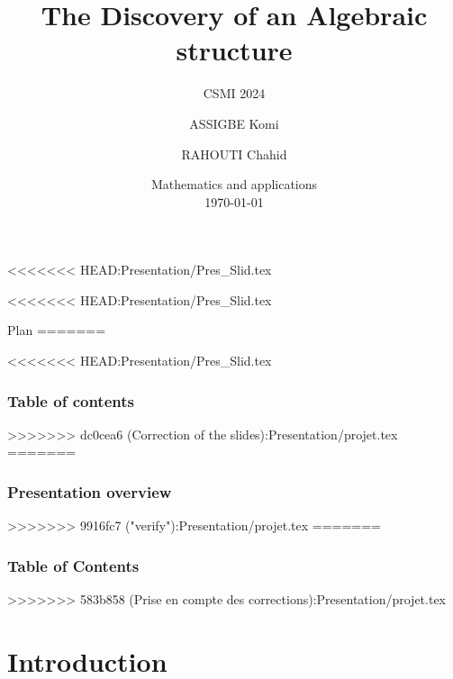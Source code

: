 \documentclass{beamer}
\title{The Discovery of an  Algebraic structure}
\subtitle{CSMI 2024}
\author[ASSIGBE Komi . RAHOUTI Chahid .]{ASSIGBE Komi \and  RAHOUTI Chahid}
\institute[]{University of Strasbourg \\ \smallskip} %
\date[\today]{Mathematics and applications \\ \today} %
\begin{document}
\begin{frame}
    \titlepage %
    \end{frame}


\begin{frame}
<<<<<<< HEAD:Presentation/Pres_Slid.tex
    \titlepage %
    \end{frame}

<<<<<<< HEAD:Presentation/Pres_Slid.tex
\begin{frame}{Plan}
\tableofcontents
=======
\begin{frame}
<<<<<<< HEAD:Presentation/Pres_Slid.tex
    \frametitle{Table of contents}
    \tableofcontents
>>>>>>> dc0cea6 (Correction of the slides):Presentation/projet.tex
=======
	\frametitle{Presentation overview } %
    \tableofcontents
>>>>>>> 9916fc7 ("verify"):Presentation/projet.tex
=======
    \frametitle{Table of Contents}
    \tableofcontents
    \end{frame}
>>>>>>> 583b858 (Prise en compte des corrections):Presentation/projet.tex
\end{frame}
\section{Introduction}


\end{document}
